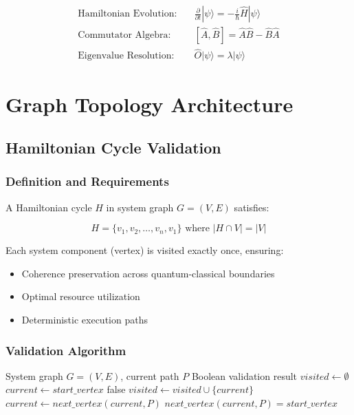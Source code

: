 \documentclass[12pt]{article}
\begin{document}
\begin{align}
\text{Hamiltonian Evolution:} \quad &\frac{\partial}{\partial t}|\psi\rangle = -\frac{i}{\hbar}\hat{H}|\psi\rangle \\
\text{Commutator Algebra:} \quad &[\hat{A}, \hat{B}] = \hat{A}\hat{B} - \hat{B}\hat{A} \\
\text{Eigenvalue Resolution:} \quad &\hat{O}|\psi\rangle = \lambda|\psi\rangle
\end{align}

\section{Graph Topology Architecture}

\subsection{Hamiltonian Cycle Validation}

\subsubsection{Definition and Requirements}

A Hamiltonian cycle $H$ in system graph $G = (V, E)$ satisfies:

\begin{equation}
H = \{v_1, v_2, \ldots, v_n, v_1\} \text{ where } |H \cap V| = |V|
\end{equation}

Each system component (vertex) is visited exactly once, ensuring:
\begin{itemize}
    \item Coherence preservation across quantum-classical boundaries
    \item Optimal resource utilization
    \item Deterministic execution paths
\end{itemize}

\subsubsection{Validation Algorithm}

\begin{algorithm}
\caption{Hamiltonian Cycle Validation}
\begin{algorithmic}
\REQUIRE System graph $G = (V, E)$, current path $P$
\ENSURE Boolean validation result
\STATE $visited \leftarrow \emptyset$
\STATE $current \leftarrow start\_vertex$
        \RETURN false
    \ENDIF
    \STATE $visited \leftarrow visited \cup \{current\}$
    \STATE $current \leftarrow next\_vertex(current, P)$
\ENDWHILE
\RETURN $next\_vertex(current, P) = start\_vertex$
\end{algorithmic}
\end{algorithm}
\end{document}
